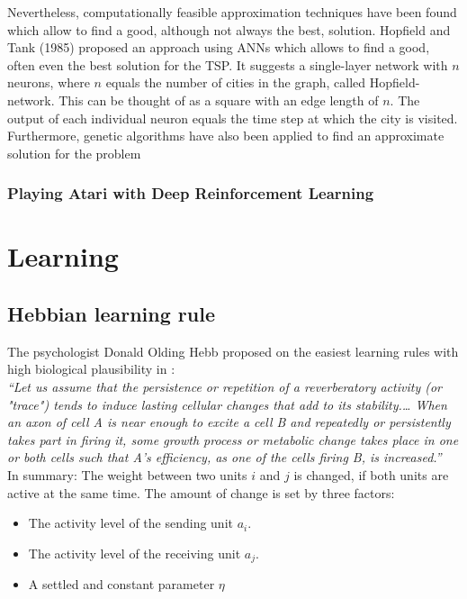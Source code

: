 \documentclass[10pt,a4paper,DIV=11]{scrreprt}
\begin{document}
Nevertheless, computationally feasible approximation techniques have been found which allow to find a good, although not always the best, solution. Hopfield and Tank (1985) proposed an approach using ANNs which allows to find a good, often even the best solution for the TSP. It suggests a single-layer network with $n$ neurons, where $n$ equals the number of cities in the graph, called Hopfield-network. This can be thought of as a square with an edge length of $n$. The output of each individual neuron equals the time step at which the city is visited. Furthermore, genetic algorithms have also been applied to find an approximate solution for the problem %

\subsection{Playing Atari with Deep Reinforcement Learning}
\cite{DEEPMIND}

\chapter{Learning}\label{ch:learning}
\section{Hebbian learning rule}
The psychologist Donald Olding Hebb proposed on the easiest learning rules with high biological plausibility in \cite{HEBB}:\\

\textit{“Let us assume that the persistence or repetition of a reverberatory activity (or "trace") tends to induce lasting cellular changes that add to its stability.… When an axon of cell A is near enough to excite a cell B and repeatedly or persistently takes part in firing it, some growth process or metabolic change takes place in one or both cells such that A's efficiency, as one of the cells firing B, is increased.”}\\

In summary: The weight between two units $i$ and $j$ is changed, if both units are active at the same time. The amount of change is set by three factors:

\begin{itemize}
\item The activity level of the sending unit $a_i$.
\item The activity level of the receiving unit $a_j$.
\item A settled and constant parameter $\eta$
\end{itemize}
\end{document}
